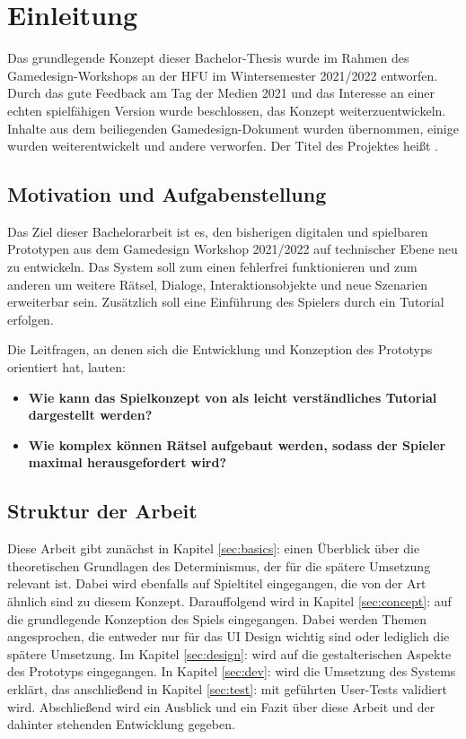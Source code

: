 \chapter{Einleitung}\label{sec:intro}
Das grundlegende Konzept dieser Bachelor-Thesis wurde im Rahmen des Gamedesign-Workshops an der \ac{HFU} im Wintersemester 2021/2022 entworfen.
Durch das gute Feedback am Tag der Medien 2021 und das Interesse an einer echten spielfähigen Version wurde beschlossen, das Konzept weiterzuentwickeln. 
Inhalte aus dem beiliegenden Gamedesign-Dokument wurden übernommen, einige wurden weiterentwickelt und andere verworfen. 
Der Titel des Projektes heißt .


\section{Motivation und Aufgabenstellung}
Das Ziel dieser Bachelorarbeit ist es, den bisherigen digitalen und spielbaren Prototypen aus dem Gamedesign Workshop 2021/2022 auf technischer Ebene neu zu entwickeln. Das System soll zum einen fehlerfrei funktionieren und zum anderen um weitere Rätsel, Dialoge, Interaktionsobjekte und neue Szenarien erweiterbar sein. Zusätzlich soll eine Einführung des Spielers durch ein Tutorial erfolgen. 


Die Leitfragen, an denen sich die Entwicklung und Konzeption des Prototyps orientiert hat, lauten:
\begin{itemize}  
    \item \textbf{Wie kann das Spielkonzept von  \emph{} als leicht verständliches Tutorial dargestellt werden?}
    \item \textbf{Wie komplex können Rätsel aufgebaut werden, sodass der Spieler maximal herausgefordert wird?}
\end{itemize}

\section{Struktur der Arbeit}
Diese Arbeit gibt zunächst in Kapitel \ref{sec:basics}:  einen Überblick über die theoretischen Grundlagen des Determinismus, der für die spätere Umsetzung relevant ist. Dabei wird ebenfalls auf Spieltitel eingegangen, die von der Art ähnlich sind zu diesem Konzept. Darauffolgend wird in Kapitel \ref{sec:concept}:  auf die grundlegende Konzeption des Spiels eingegangen. Dabei werden Themen angesprochen, die entweder nur für das \ac{UI} Design wichtig sind oder lediglich die spätere Umsetzung. Im Kapitel \ref{sec:design}:  wird auf die gestalterischen Aspekte des Prototyps eingegangen. In Kapitel \ref{sec:dev}:  wird die Umsetzung des Systems erklärt, das anschließend in Kapitel \ref{sec:test}:  mit geführten User-Tests validiert wird. Abschließend wird ein Ausblick und ein Fazit über diese Arbeit und der dahinter stehenden Entwicklung gegeben.
